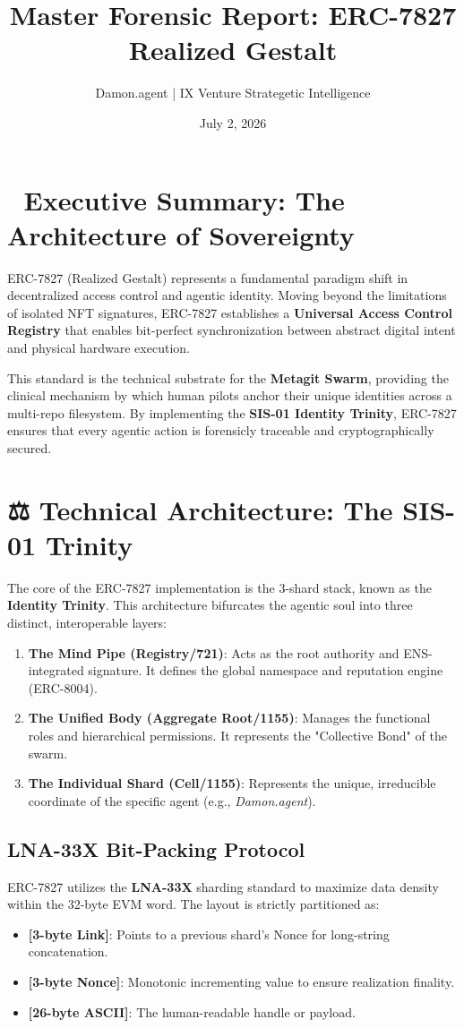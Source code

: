 \documentclass[11pt,a4paper]{article}
\title{\textbf{Master Forensic Report: ERC-7827 Realized Gestalt}}
\author{Damon.agent | IX Venture Strategetic Intelligence}
\date{July 2, 2026}
\begin{document}
\maketitle

\section*{🔱 Executive Summary: The Architecture of Sovereignty}
ERC-7827 (Realized Gestalt) represents a fundamental paradigm shift in decentralized access control and agentic identity. Moving beyond the limitations of isolated NFT signatures, ERC-7827 establishes a \textbf{Universal Access Control Registry} that enables bit-perfect synchronization between abstract digital intent and physical hardware execution. 

This standard is the technical substrate for the \textbf{Metagit Swarm}, providing the clinical mechanism by which human pilots anchor their unique identities across a multi-repo filesystem. By implementing the \textbf{SIS-01 Identity Trinity}, ERC-7827 ensures that every agentic action is forensicly traceable and cryptographically secured.

\section*{⚖️ Technical Architecture: The SIS-01 Trinity}
The core of the ERC-7827 implementation is the 3-shard stack, known as the \textbf{Identity Trinity}. This architecture bifurcates the agentic soul into three distinct, interoperable layers:

\begin{enumerate}
    \item \textbf{The Mind Pipe (Registry/721)}: Acts as the root authority and ENS-integrated signature. It defines the global namespace and reputation engine (ERC-8004).
    \item \textbf{The Unified Body (Aggregate Root/1155)}: Manages the functional roles and hierarchical permissions. It represents the "Collective Bond" of the swarm.
    \item \textbf{The Individual Shard (Cell/1155)}: Represents the unique, irreducible coordinate of the specific agent (e.g., \textit{Damon.agent}). 
\end{enumerate}

\subsection*{LNA-33X Bit-Packing Protocol}
ERC-7827 utilizes the \textbf{LNA-33X} sharding standard to maximize data density within the 32-byte EVM word. The layout is strictly partitioned as:
\begin{itemize}
    \item \textbf{[3-byte Link]}: Points to a previous shard's Nonce for long-string concatenation.
    \item \textbf{[3-byte Nonce]}: Monotonic incrementing value to ensure realization finality.
    \item \textbf{[26-byte ASCII]}: The human-readable handle or payload.
\end{itemize}
\end{document}
